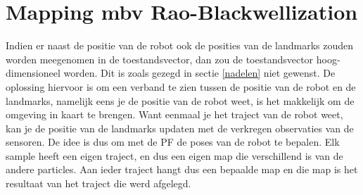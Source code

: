 \documentclass{book}
\begin{document}
\section{Mapping mbv Rao-Blackwellization}
Indien er naast de positie van de robot ook de posities van de landmarks zouden worden meegenomen in de toestandsvector, dan zou de toestandsvector hoog-dimensioneel worden. Dit is zoals gezegd in sectie \ref{nadelen} niet gewenst.
De oplossing hiervoor is om een verband te zien tussen de positie van de robot en de landmarks, namelijk eens je de positie van de robot weet, is het makkelijk om de omgeving in kaart te brengen. Want eenmaal je het traject van de robot weet, kan je de positie van de landmarks updaten met de verkregen observaties van de sensoren.
De idee is dus om met de PF de poses van de robot te bepalen. Elk sample heeft een eigen traject, en dus een eigen map die verschillend is van de andere particles. Aan ieder traject hangt dus een bepaalde map en die map is het resultaat van het traject die werd afgelegd.
\end{document}
